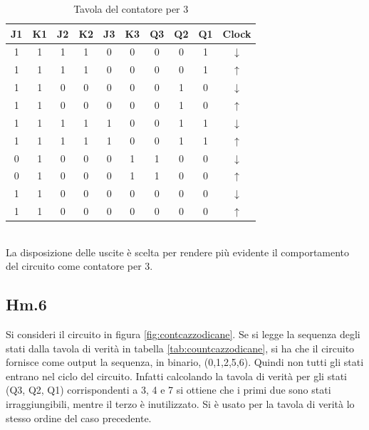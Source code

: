 \documentclass[journal, a4paper]{IEEEtran}
\begin{document}
\begin{table}[htp]
\centering
\caption{Tavola del contatore per 3}
\label{tab:count3}
\begin{tabular}{c|c|c|c|c|c|c|c|c|c}

\textbf{J1} & \textbf{K1} &\textbf{ J2} & \textbf{K2} & \textbf{J3} & \textbf{K3} & \textbf{Q3} & \textbf{Q2} & \textbf{Q1} & Clock \\ 
\hline
1 & 1 & 1 & 1 & 0 & 0 & 0 & 0 & 1 & $\downarrow$ \\ 

1 & 1 & 1 & 1 & 0 & 0 & 0 & 0 & 1 & $\uparrow$ \\ 
 
1 & 1 & 0 & 0 & 0 & 0 & 0 & 1 & 0 & $\downarrow$ \\ 
 
1 & 1 & 0 & 0 & 0 & 0 & 0 & 1 & 0 & $\uparrow$ \\ 

1 & 1 & 1 & 1 & 1 & 0 & 0 & 1 & 1 & $\downarrow$ \\ 

1 & 1 & 1 & 1 & 1 & 0 & 0 & 1 & 1 & $\uparrow$ \\ 

0 & 1 & 0 & 0 & 0 & 1 & 1 & 0 & 0 & $\downarrow$ \\ 
 
0 & 1 & 0 & 0 & 0 & 1 & 1 & 0 & 0 & $\uparrow$ \\ 
 
1 & 1 & 0 & 0 & 0 & 0 & 0 & 0 & 0 & $\downarrow$ \\ 
 
1 & 1 & 0 & 0 & 0 & 0 & 0 & 0 & 0 & $\uparrow$ \\ 
\hline
\end{tabular} 
\end{table}
~\\

La disposizione delle uscite è scelta per rendere più evidente il comportamento del circuito come contatore per 3.

\subsection{Hm.6}

Si consideri il circuito in figura \ref{fig:contcazzodicane}. Se si legge la sequenza degli stati dalla tavola di verità in tabella \ref{tab:countcazzodicane}, si ha che il circuito fornisce come output la sequenza, in binario, (0,1,2,5,6). Quindi non tutti gli stati entrano nel ciclo del circuito. Infatti calcolando la tavola di verità per gli stati (Q3, Q2, Q1) corrispondenti a 3, 4 e 7 si ottiene che i primi due sono stati irraggiungibili, mentre il terzo è inutilizzato. Si è usato per la tavola di verità lo stesso ordine del caso precedente.
\end{document}

